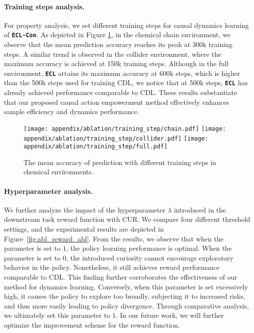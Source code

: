 \paragraph{Training steps analysis.}
For property analysis, we set different training steps for causal dynamics learning of \texttt{\textbf{ECL-Con}}. As depicted in Figure \ref{fig:abl_train_step}, in the chemical chain environment, we observe that the mean prediction accuracy reaches its peak at 300k training steps. A similar trend is observed in the collider environment, where the maximum accuracy is achieved at 150k training steps. Although in the full environment, \texttt{\textbf{ECL}} attains its maximum accuracy at 600k steps, which is higher than the 500k steps used for training CDL, we notice that at 500k steps, \texttt{\textbf{ECL}} has already achieved performance comparable to CDL. These results substantiate that our proposed causal action empowerment method effectively enhances sample efficiency and dynamics performance. 

\begin{figure}[t]
    \centering
    \texttt{[image: appendix/ablation/training\_step/chain.pdf]}
     \texttt{[image: appendix/ablation/training\_step/collider.pdf]}
      \texttt{[image: appendix/ablation/training\_step/full.pdf]}
   \caption{The mean accuracy of prediction with different training steps in chemical environments.}
\label{fig:abl_train_step}
\end{figure}

\paragraph{Hyperparameter analysis.} 
We further analyze the impact of the hyperparameter $\lambda$ introduced in the downstream task reward function with CUR. We compare four different threshold settings, and the experimental results are depicted in Figure~\ref{fig:abl_reward_abl}. From the results, we observe that when the parameter is set to $1$, the policy learning performance is optimal. When the parameter is set to $0$, the introduced curiosity cannot encourage exploratory behavior in the policy. Nonetheless, it still achieves reward performance comparable to CDL. This finding further corroborates the effectiveness of our method for dynamics learning. Conversely, when this parameter is set excessively high, it causes the policy to explore too broadly, subjecting it to increased risks, and thus more easily leading to policy divergence. Through comparative analysis, we ultimately set this parameter to $1$. In our future work, we will further optimize the improvement scheme for the reward function.

